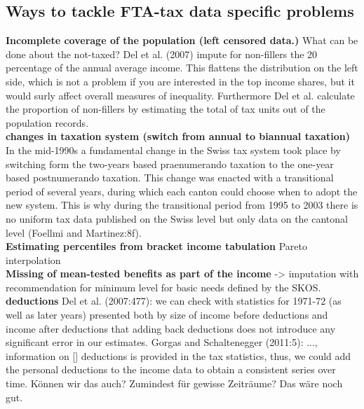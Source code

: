 \subsection{Ways to tackle FTA-tax data specific problems}

\textbf{Incomplete coverage of the population (left censored data.)} What can be done about the not-taxed? Del et al. (2007) impute for non-fillers the 20 percentage of the annual average income. This flattens the distribution on the left side, which is not a problem if you are interested in the top income shares, but it would surly affect overall measures of inequality. Furthermore Del et al. calculate the proportion of non-fillers by estimating the total of tax units out of the population records. \\

\textbf{changes in taxation system  (switch from annual to biannual taxation)} In the mid-1990s a fundamental change in the Swiss tax system took place by switching form the two-years based praenumerando taxation to the one-year based postnumerando taxation. This change was enacted with a transitional period of several years, during which each canton could choose when to adopt the new system.  This is why during the transitional period from 1995 to 2003 there is no uniform tax data published on the Swiss level but only data on the cantonal level  (Foellmi and Martinez:8f). \\

\textbf{Estimating percentiles from bracket income tabulation} Pareto interpolation \\ 

\textbf{Missing of mean-tested benefits as part of the income} -> imputation with recommendation for minimum level for basic needs defined by the SKOS.\\

\textbf{deductions} Del et al. (2007:477): we can check with statistics for 1971-72 (as well as later years) presented both by size of income before deductions and income after deductions that adding back deductions does not introduce any significant error in our estimates.
Gorgas and Schaltenegger (2011:5): ..., information on [] deductions is provided in the tax statistics, thus, we could add the personal deductions to the income data to obtain a consistent series over time. Können wir das auch? Zumindest für gewisse Zeiträume? Das wäre noch gut. \\

